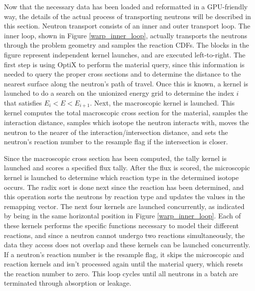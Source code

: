 Now that the necessary data has been loaded and reformatted in a GPU-friendly way, the details of the actual process of transporting neutrons will be described in this section.  Neutron transport consists of an inner and outer transport loop.  The inner loop, shown in Figure \ref{warp_inner_loop}, actually transports the neutrons through the problem geometry and samples the reaction CDFs.  The blocks in the figure represent independent kernel launches, and are executed left-to-right.  The first step is using OptiX to perform the material query, since this information is needed to query the proper cross sections and to determine the distance to the nearest surface along the neutron's path of travel.  Once this is known, a kernel is launched to do a search on the unionized energy grid to determine the index $i$ that satisfies $E_i<E<E_{i+1}$.  Next, the macroscopic kernel is launched. This kernel computes the total macroscopic cross section for the material, samples the interaction distance, samples which isotope the neutron interacts with, moves the neutron to the nearer of the interaction/intersection distance, and sets the neutron's reaction number to the resample flag if the intersection is closer.  

Since the macroscopic cross section has been computed, the tally kernel is launched and scores a specified flux tally.  After the flux is scored, the microscopic kernel is launched to determine which reaction type in the determined isotope occurs.  The radix sort is done next since the reaction has been determined, and this operation sorts the neutrons by reaction type and updates the values in the remapping vector.  The next four kernels are launched concurrently, as indicated by being in the same horizontal position in Figure \ref{warp_inner_loop}.  Each of these kernels performs the specific functions necessary to model their different reactions, and since a neutron cannot undergo two reactions simultaneously, the data they access does not overlap and these kernels can be launched concurrently.  If a neutron's reaction number is the resample flag, it skips the microscopic and reaction kernels and isn't processed again until the material query, which resets the reaction number to zero.   This loop cycles until all neutrons in a batch are terminated through absorption or leakage.  

